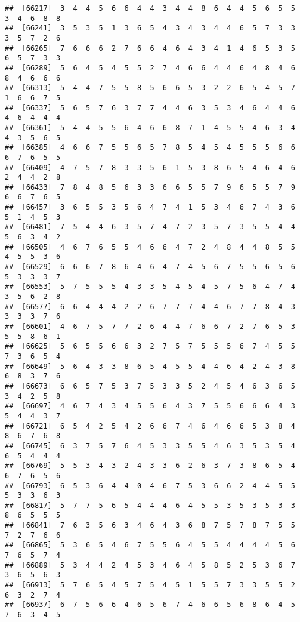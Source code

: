 \documentclass[
]{book}
\begin{document}
\begin{verbatim}
##  [66217]  3  4  4  5  6  6  4  4  3  4  4  8  6  4  4  5  6  5  5  3  4  6  8  8
##  [66241]  3  5  3  5  1  3  6  5  4  3  4  3  4  4  6  5  7  3  3  3  5  7  2  6
##  [66265]  7  6  6  6  2  7  6  6  4  6  4  3  4  1  4  6  5  3  5  6  5  7  3  3
##  [66289]  5  6  4  5  4  5  5  2  7  4  6  6  4  4  6  4  8  4  6  8  4  6  6  6
##  [66313]  5  4  4  7  5  5  8  5  6  6  5  3  2  2  6  5  4  5  7  1  6  6  7  5
##  [66337]  5  6  5  7  6  3  7  7  4  4  6  3  5  3  4  6  4  4  6  4  6  4  4  4
##  [66361]  5  4  4  5  5  6  4  6  6  8  7  1  4  5  5  4  6  3  4  4  3  5  6  5
##  [66385]  4  6  6  7  5  5  6  5  7  8  5  4  5  4  5  5  5  6  6  6  7  6  5  5
##  [66409]  4  7  5  7  8  3  3  5  6  1  5  3  8  6  5  4  6  4  6  2  4  4  2  8
##  [66433]  7  8  4  8  5  6  3  3  6  6  5  5  7  9  6  5  5  7  9  6  6  7  6  5
##  [66457]  3  6  5  5  3  5  6  4  7  4  1  5  3  4  6  7  4  3  6  5  1  4  5  3
##  [66481]  7  5  4  4  6  3  5  7  4  7  2  3  5  7  3  5  5  4  4  5  6  3  4  2
##  [66505]  4  6  7  6  5  5  4  6  6  4  7  2  4  8  4  4  8  5  5  4  5  5  3  6
##  [66529]  6  6  6  7  8  6  4  6  4  7  4  5  6  7  5  5  6  5  6  5  3  3  3  7
##  [66553]  5  7  5  5  5  4  3  3  5  4  5  4  5  7  5  6  4  7  4  3  5  6  2  8
##  [66577]  6  6  4  4  4  2  2  6  7  7  7  4  4  6  7  7  8  4  3  3  3  3  7  6
##  [66601]  4  6  7  5  7  7  2  6  4  4  7  6  6  7  2  7  6  5  3  5  5  8  6  1
##  [66625]  5  6  5  5  6  6  3  2  7  5  7  5  5  5  6  7  4  5  5  7  3  6  5  4
##  [66649]  5  6  4  3  3  8  6  5  4  5  5  4  4  6  4  2  4  3  8  6  8  3  7  6
##  [66673]  6  6  5  7  5  3  7  5  3  3  5  2  4  5  4  6  3  6  5  3  4  2  5  8
##  [66697]  4  6  7  4  3  4  5  5  6  4  3  7  5  5  6  6  6  4  3  5  4  4  3  7
##  [66721]  6  5  4  2  5  4  2  6  6  7  4  6  4  6  6  5  3  8  4  8  6  7  6  8
##  [66745]  6  3  7  5  7  6  4  5  3  3  5  5  4  6  3  5  3  5  4  6  5  4  4  4
##  [66769]  5  5  3  4  3  2  4  3  3  6  2  6  3  7  3  8  6  5  4  6  7  6  5  6
##  [66793]  6  5  3  6  4  4  0  4  6  7  5  3  6  6  2  4  4  5  5  5  3  3  6  3
##  [66817]  5  7  7  5  6  5  4  4  4  6  4  5  5  3  5  3  5  3  3  8  6  5  5  5
##  [66841]  7  6  3  5  6  3  4  6  4  3  6  8  7  5  7  8  7  5  5  7  2  7  6  6
##  [66865]  5  3  6  5  4  6  7  5  5  6  4  5  5  4  4  4  4  5  6  7  6  5  7  4
##  [66889]  5  3  4  4  2  4  5  3  4  6  4  5  8  5  2  5  3  6  7  3  6  5  6  3
##  [66913]  5  7  6  5  4  5  7  5  4  5  1  5  5  7  3  3  5  5  2  6  3  2  7  4
##  [66937]  6  7  5  6  6  4  6  5  6  7  4  6  6  5  6  8  6  4  5  7  6  3  4  5

\end{verbatim}
\end{document}

